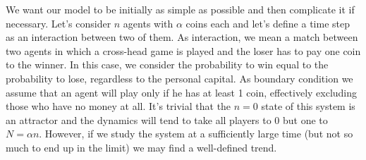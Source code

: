 We want our model to be initially as simple as possible and then complicate it if necessary.
Let's consider $n$ agents with $\alpha$ coins each and let's define a time step as an interaction between two of them.
As interaction, we mean a match between two agents in which a cross-head game is played and the loser has to pay one coin to the winner.
In this case, we consider the probability to win equal to the probability to lose, regardless to the personal capital.
As boundary condition we assume that an agent will play only if he has at least 1 coin, effectively excluding those who have no money at all.
It's trivial that the $n = 0$ state of this system is an attractor and the dynamics will tend to take all players to 0 but one to $N = \alpha n$.
However, if we study the system at a sufficiently large time (but not so much to end up in the limit) we may find a well-defined trend.

